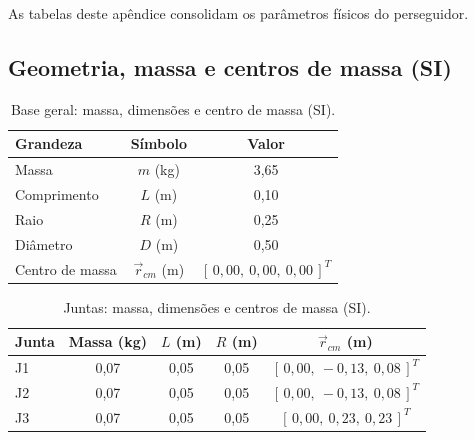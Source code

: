 
\label{ap:params_chaser}

As tabelas deste apêndice consolidam os parâmetros físicos do perseguidor.

\subsection{Geometria, massa e centros de massa (SI)}

\begin{table}[H]
\centering
\caption{Base geral: massa, dimensões e centro de massa (SI).}
\label{tab:chaser_base_SI}
\begin{tabular}{lcc}
\hline
\textbf{Grandeza} & \textbf{Símbolo} & \textbf{Valor} \\
\hline
Massa & $m$ (kg) & 3,65 \\
Comprimento & $L$ (m) & 0,10 \\
Raio & $R$ (m) & 0,25 \\
Diâmetro & $D$ (m) & 0,50 \\
Centro de massa & $\vec{r}_{cm}$ (m) & $[\,0,00,\ 0,00,\ 0,00\,]^T$ \\
\hline
\end{tabular}
\end{table}

\begin{table}[H]
\centering
\caption{Juntas: massa, dimensões e centros de massa (SI).}
\label{tab:chaser_juntas_SI}
\begin{tabular}{lcccc}
\hline
\textbf{Junta} & \textbf{Massa (kg)} & \textbf{$L$ (m)} & \textbf{$R$ (m)} & \textbf{$\vec{r}_{cm}$ (m)} \\
\hline
J1 & 0,07 & 0,05 & 0,05 & $[\,0,00,\ -0,13,\ 0,08\,]^T$ \\
J2 & 0,07 & 0,05 & 0,05 & $[\,0,00,\ -0,13,\ 0,08\,]^T$ \\
J3 & 0,07 & 0,05 & 0,05 & $[\,0,00,\ 0,23,\ 0,23\,]^T$ \\
\hline
\end{tabular}
\end{table}

